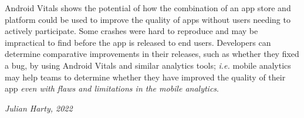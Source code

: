 Android Vitals shows the potential of how the combination of an app store and platform could be used to improve the quality of apps without users needing to actively participate. Some crashes were hard to reproduce and may be impractical to find before the app is released to end users. Developers can determine comparative improvements in their releases, such as whether they fixed a bug, by using Android Vitals and similar analytics tools; \emph{i.e.} mobile analytics may help teams to determine whether they have improved the quality of their app \emph{even with flaws and limitations in the mobile analytics}.

\begin{flushright}
	\textit{Julian Harty, 2022}
\end{flushright}




